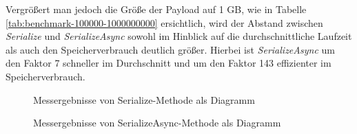 Vergrößert man jedoch die Größe der Payload auf 1 GB, wie in Tabelle \ref{tab:benchmark-100000-1000000000} ersichtlich, wird der Abstand zwischen \textit{Serialize} und \textit{SerializeAsync} sowohl im Hinblick auf die durchschnittliche Laufzeit als auch den Speicherverbrauch deutlich größer. Hierbei ist \textit{SerializeAsync} um den Faktor 7 schneller im Durchschnitt und um den Faktor 143 effizienter im Speicherverbrauch.

\begin{figure}[h]
    \centering
    \caption{Messergebnisse von Serialize-Methode als Diagramm}
    \label{fig:messergebnisse-serialize}
\end{figure}

\begin{figure}[h]
    \centering
    \caption{Messergebnisse von SerializeAsync-Methode als Diagramm}
    \label{fig:messergebnisse-serialize-async}
\end{figure}